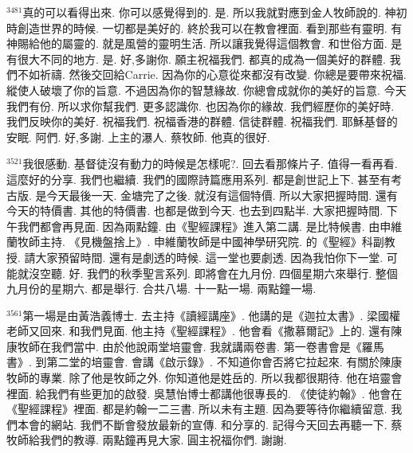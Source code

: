 \documentclass{book}
\begin{document}
$^{3481}$真的可以看得出來.
你可以感覺得到的.
是.
所以我就對應到金人牧師說的.
神初時創造世界的時候.
一切都是美好的.
終於我可以在教會裡面.
看到那些有靈明.
有神賜給他的屬靈的.
就是風營的靈明生活.
所以讓我覺得這個教會.
和世俗方面.
是有很大不同的地方.
是.
好,多謝你.
願主祝福我們.
都真的成為一個美好的群體.
我們不如祈禱.
然後交回給Carrie.
因為你的心意從來都沒有改變.
你總是要帶來祝福.
縱使人破壞了你的旨意.
不過因為你的智慧緣故.
你總會成就你的美好的旨意.
今天我們有份.
所以求你幫我們.
更多認識你.
也因為你的緣故.
我們經歷你的美好時.
我們反映你的美好.
祝福我們.
祝福香港的群體.
信徒群體.
祝福我們.
耶穌基督的安眠.
阿們.
好,多謝.
上主的瀑人.
蔡牧師.
他真的很好.

$^{3521}$我很感動.
基督徒沒有動力的時候是怎樣呢?.
回去看那條片子.
值得一看再看.
這麼好的分享.
我們也繼續.
我們的國際詩篇應用系列.
都是創世記上下.
甚至有考古版.
是今天最後一天.
金塘完了之後.
就沒有這個特價.
所以大家把握時間.
還有今天的特價書.
其他的特價書.
也都是做到今天.
也去到四點半.
大家把握時間.
下午我們都會再見面.
因為兩點鐘.
由《聖經課程》進入第二講.
是比特候書.
由申維蘭牧師主持.
《見機盤捨上》.
申維蘭牧師是中國神學研究院.
的《聖經》科副教授.
請大家預留時間.
還有是劇透的時候.
這一堂也要劇透.
因為我怕你下一堂.
可能就沒空聽.
好.
我們的秋季聖言系列.
即將會在九月份.
四個星期六來舉行.
整個九月份的星期六.
都是舉行.
合共八場.
十一點一場.
兩點鐘一場.

$^{3561}$第一場是由黃浩義博士.
去主持《讀經講座》.
他講的是《迦拉太書》.
梁國權老師又回來.
和我們見面.
他主持《聖經課程》.
他會看《撒慕爾記》上的.
還有陳康牧師在我們當中.
由於他說兩堂培靈會.
我就講兩卷書.
第一卷書會是《羅馬書》.
到第二堂的培靈會.
會講《啟示錄》.
不知道你會否將它拉起來.
有關於陳康牧師的專業.
除了他是牧師之外.
你知道他是姓岳的.
所以我都很期待.
他在培靈會裡面.
給我們有些更加的啟發.
吳慧怡博士都講他很專長的.
《使徒約翰》.
他會在《聖經課程》裡面.
都是約翰一二三書.
所以未有主題.
因為要等待你繼續留意.
我們本會的網站.
我們不斷會發放最新的宣傳.
和分享的.
記得今天回去再聽一下.
蔡牧師給我們的教導.
兩點鐘再見大家.
圓主祝福你們.
謝謝.
\newpage
\end{document}
